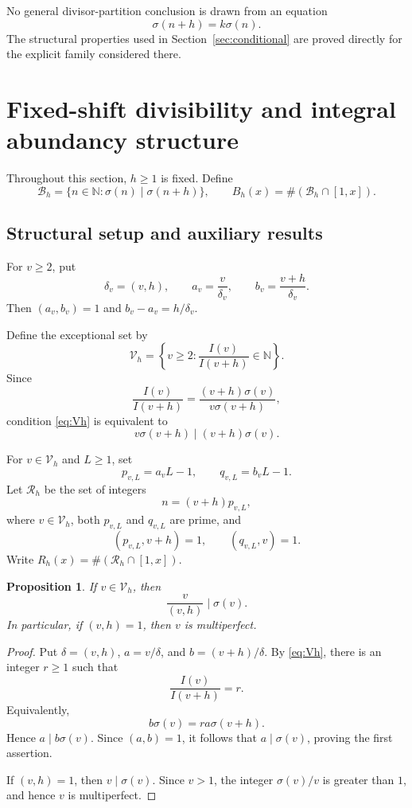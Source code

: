 \documentclass[11pt,reqno]{amsart}
\numberwithin{equation}{section}
\theoremstyle{plain}
\newtheorem{proposition}[theorem]{Proposition}
\theoremstyle{definition}
\theoremstyle{remark}
\newcommand{\N}{\mathbb N}
\begin{document}
No general divisor-partition conclusion is drawn from an equation
\[
\sigma(n+h)=k\sigma(n).
\]
The structural properties used in Section~\ref{sec:conditional} are proved directly for the explicit family considered there.

\section{Fixed-shift divisibility and integral abundancy structure}\label{sec:divisibility}

Throughout this section, $h\ge1$ is fixed. Define
\[
\mathcal B_h=\{n\in\N:\sigma(n)\mid\sigma(n+h)\},
\qquad
B_h(x)=\#(\mathcal B_h\cap[1,x]).
\]

\subsection{Structural setup and auxiliary results}

For $v\ge2$, put
\[
\delta_v=(v,h),
\qquad
a_v=\frac{v}{\delta_v},
\qquad
b_v=\frac{v+h}{\delta_v}.
\]
Then $(a_v,b_v)=1$ and $b_v-a_v=h/\delta_v$.

Define the exceptional set by
\begin{equation}\label{eq:Vh}
\mathcal V_h
=
\left\{v\ge2:\frac{I(v)}{I(v+h)}\in\N\right\}.
\end{equation}
Since
\[
\frac{I(v)}{I(v+h)}
=
\frac{(v+h)\sigma(v)}{v\sigma(v+h)},
\]
condition \eqref{eq:Vh} is equivalent to
\begin{equation}\label{eq:Vh-divisibility}
v\sigma(v+h)\mid(v+h)\sigma(v).
\end{equation}

For $v\in\mathcal V_h$ and $L\ge1$, set
\[
p_{v,L}=a_vL-1,
\qquad
q_{v,L}=b_vL-1.
\]
Let $\mathcal R_h$ be the set of integers
\begin{equation}\label{eq:regular-n}
n=(v+h)p_{v,L},
\end{equation}
where $v\in\mathcal V_h$, both $p_{v,L}$ and $q_{v,L}$ are prime, and
\begin{equation}\label{eq:cross-coprime}
(p_{v,L},v+h)=1,
\qquad
(q_{v,L},v)=1.
\end{equation}
Write $R_h(x)=\#(\mathcal R_h\cap[1,x])$.

\begin{proposition}\label{prop:integral-abundancy}
If $v\in\mathcal V_h$, then
\[
\frac{v}{(v,h)}\mid\sigma(v).
\]
In particular, if $(v,h)=1$, then $v$ is multiperfect.
\end{proposition}
\begin{proof}
Put $\delta=(v,h)$, $a=v/\delta$, and $b=(v+h)/\delta$. By \eqref{eq:Vh}, there is an integer $r\ge1$ such that
\[
\frac{I(v)}{I(v+h)}=r.
\]
Equivalently,
\[
b\sigma(v)=ra\sigma(v+h).
\]
Hence $a\mid b\sigma(v)$. Since $(a,b)=1$, it follows that $a\mid\sigma(v)$, proving the first assertion.

If $(v,h)=1$, then $v\mid\sigma(v)$. Since $v>1$, the integer $\sigma(v)/v$ is greater than $1$, and hence $v$ is multiperfect.
\end{proof}
\end{document}
